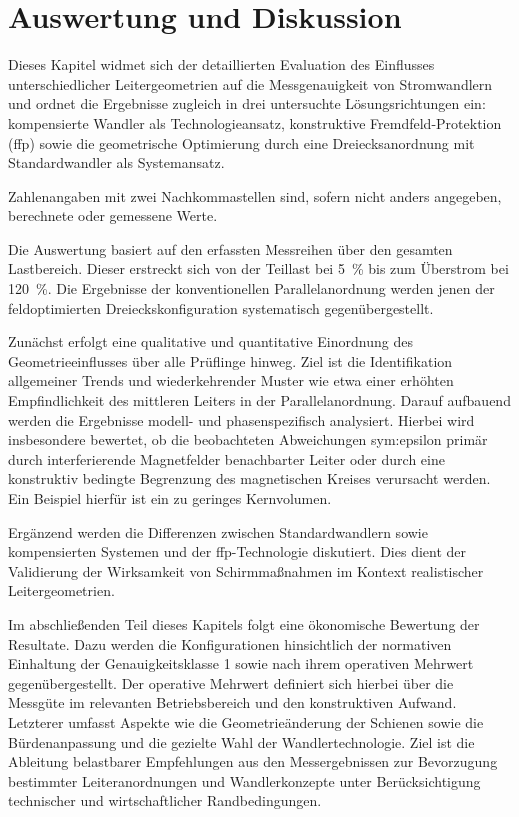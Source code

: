 \section{Auswertung und Diskussion}
\label{sec:auswertung_diskussion}

Dieses Kapitel widmet sich der detaillierten Evaluation des Einflusses unterschiedlicher Leitergeometrien auf die Messgenauigkeit von Stromwandlern und ordnet die Ergebnisse zugleich in drei untersuchte Lösungsrichtungen ein: kompensierte Wandler als Technologieansatz, konstruktive Fremdfeld-Protektion (\gls{ffp}) sowie die geometrische Optimierung durch eine Dreiecksanordnung mit Standardwandler als Systemansatz.

Zahlenangaben mit zwei Nachkommastellen sind, sofern nicht anders angegeben, berechnete oder gemessene Werte.

Die Auswertung basiert auf den erfassten Messreihen über den gesamten Lastbereich. Dieser erstreckt sich von der Teillast bei \SI{5}{\percent} bis zum Überstrom bei \SI{120}{\percent}. Die Ergebnisse der konventionellen Parallelanordnung werden jenen der feldoptimierten Dreieckskonfiguration systematisch gegenübergestellt.

Zunächst erfolgt eine qualitative und quantitative Einordnung des Geometrieeinflusses über alle Prüflinge hinweg. Ziel ist die Identifikation allgemeiner Trends und wiederkehrender Muster wie etwa einer erhöhten Empfindlichkeit des mittleren Leiters in der Parallelanordnung. Darauf aufbauend werden die Ergebnisse modell- und phasenspezifisch analysiert. Hierbei wird insbesondere bewertet, ob die beobachteten Abweichungen \gls{sym:epsilon} primär durch interferierende Magnetfelder benachbarter Leiter oder durch eine konstruktiv bedingte Begrenzung des magnetischen Kreises verursacht werden. Ein Beispiel hierfür ist ein zu geringes Kernvolumen.

Ergänzend werden die Differenzen zwischen Standardwandlern sowie kompensierten Systemen und der \gls{ffp}-Technologie diskutiert. Dies dient der Validierung der Wirksamkeit von Schirmmaßnahmen im Kontext realistischer Leitergeometrien.

Im abschließenden Teil dieses Kapitels folgt eine ökonomische Bewertung der Resultate. Dazu werden die Konfigurationen hinsichtlich der normativen Einhaltung der Genauigkeitsklasse \num{1} sowie nach ihrem operativen Mehrwert gegenübergestellt. Der operative Mehrwert definiert sich hierbei über die Messgüte im relevanten Betriebsbereich und den konstruktiven Aufwand. Letzterer umfasst Aspekte wie die Geometrieänderung der Schienen sowie die Bürdenanpassung und die gezielte Wahl der Wandlertechnologie. Ziel ist die Ableitung belastbarer Empfehlungen aus den Messergebnissen zur Bevorzugung bestimmter Leiteranordnungen und Wandlerkonzepte unter Berücksichtigung technischer und wirtschaftlicher Randbedingungen.

